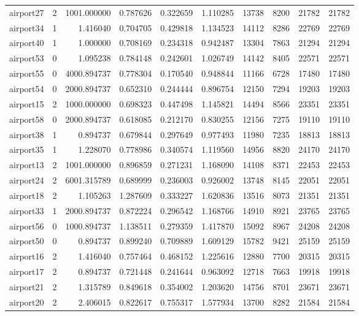\begin{longtable}{|l|r|r|r|r|r|r|r|r|r|}
airport27 & 2 & 1001.000000 & 0.787626 & 0.322659 & 1.110285 & 13738 & 8200 & 21782 & 21782 \\
airport34 & 1 & 1.416040 & 0.704705 & 0.429818 & 1.134523 & 14112 & 8286 & 22769 & 22769 \\
airport40 & 1 & 1.000000 & 0.708169 & 0.234318 & 0.942487 & 13304 & 7863 & 21294 & 21294 \\
airport53 & 0 & 1.095238 & 0.784148 & 0.242601 & 1.026749 & 14142 & 8405 & 22571 & 22571 \\
airport55 & 0 & 4000.894737 & 0.778304 & 0.170540 & 0.948844 & 11166 & 6728 & 17480 & 17480 \\
airport54 & 0 & 2000.894737 & 0.652310 & 0.244444 & 0.896754 & 12150 & 7294 & 19203 & 19203 \\
airport15 & 2 & 1000.000000 & 0.698323 & 0.447498 & 1.145821 & 14494 & 8566 & 23351 & 23351 \\
airport58 & 0 & 2000.894737 & 0.618085 & 0.212170 & 0.830255 & 12156 & 7275 & 19110 & 19110 \\
airport38 & 1 & 0.894737 & 0.679844 & 0.297649 & 0.977493 & 11980 & 7235 & 18813 & 18813 \\
airport35 & 1 & 1.228070 & 0.778986 & 0.340574 & 1.119560 & 14956 & 8820 & 24170 & 24170 \\
airport13 & 2 & 1001.000000 & 0.896859 & 0.271231 & 1.168090 & 14108 & 8371 & 22453 & 22453 \\
airport24 & 2 & 6001.315789 & 0.689999 & 0.236003 & 0.926002 & 13748 & 8145 & 22051 & 22051 \\
airport18 & 2 & 1.105263 & 1.287609 & 0.333227 & 1.620836 & 13516 & 8073 & 21351 & 21351 \\
airport33 & 1 & 2000.894737 & 0.872224 & 0.296542 & 1.168766 & 14910 & 8921 & 23765 & 23765 \\
airport56 & 0 & 1000.894737 & 1.138511 & 0.279359 & 1.417870 & 15092 & 8967 & 24208 & 24208 \\
airport50 & 0 & 0.894737 & 0.899240 & 0.709889 & 1.609129 & 15782 & 9421 & 25159 & 25159 \\
airport16 & 2 & 1.416040 & 0.757464 & 0.468152 & 1.225616 & 12880 & 7700 & 20315 & 20315 \\
airport17 & 2 & 0.894737 & 0.721448 & 0.241644 & 0.963092 & 12718 & 7663 & 19918 & 19918 \\
airport21 & 2 & 1.315789 & 0.849618 & 0.354002 & 1.203620 & 14756 & 8701 & 23671 & 23671 \\
airport20 & 2 & 2.406015 & 0.822617 & 0.755317 & 1.577934 & 13700 & 8282 & 21584 & 21584 \\

\end{longtable}
